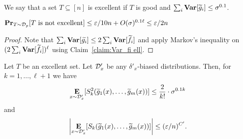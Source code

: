 We say that a set $T\subseteq [n]$ is {\sf excellent} if $T$ is good and $\sum_{i}{\mathop{\bf Var\/}}[\widetilde{g}_i] \le \sigma^{0.1}$.

\begin{claim}
$\mathop{\bf Pr\/}_{T\sim {\mathcal{D}}_p}[\text{$T$ is not excellent}] \le \varepsilon/10n + O(\sigma)^{0.1\ell} \le \varepsilon/2n$	
\end{claim}
\begin{proof}
Note that $\sum_{i}\mathop{\bf Var\/}[\widetilde{g_i}] \le 2\sum_{i}\mathop{\bf Var\/}[\widetilde{f_i}]$ and apply Markov's inequality on $(2\sum_{i}\mathop{\bf Var\/}[\widetilde{f_i}])^{\ell}$ using Claim~\ref{claim:Var_fi ell}.
\end{proof}

\begin{claim}\label{claim:symmetric-excellent}
Let $T$ be an excellent set. Let ${\mathcal{D}'_x}$ be any $\delta'_x$-biased distributions.
Then, for $k = 1, \ldots, \ell+1$ we have
$$\mathop{\bf E\/}_{x\sim {\mathcal{D}'_x}}[ S_{k}^2(\widetilde{g}_1(x), \ldots, \widetilde{g}_m(x))] \le  \frac{2}{k!} \cdot \sigma^{0.1 k}$$
and $$\left|\mathop{\bf E\/}_{x \sim {\mathcal{D}'_x}}[S_{k}(\widetilde{g}_1(x), \ldots, \widetilde{g}_m(x))]\right| \le (\varepsilon/n)^{C'}.$$
\end{claim}

